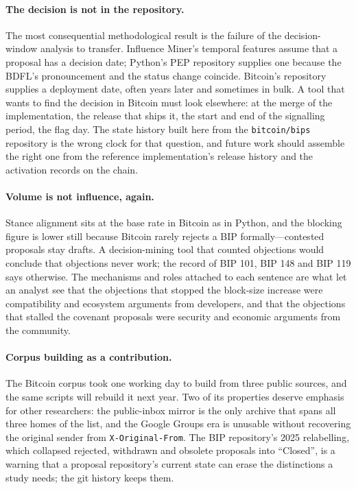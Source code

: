 \documentclass[sigconf,screen]{acmart}
\begin{document}
\paragraph{The decision is not in the repository.} The most consequential methodological result is the failure of the decision-window analysis to transfer. Influence Miner's temporal features assume that a proposal has a decision date; Python's PEP repository supplies one because the BDFL's pronouncement and the status change coincide. Bitcoin's repository supplies a deployment date, often years later and sometimes in bulk. A tool that wants to find the decision in Bitcoin must look elsewhere: at the merge of the implementation, the release that ships it, the start and end of the signalling period, the flag day. The state history built here from the \texttt{bitcoin/bips} repository is the wrong clock for that question, and future work should assemble the right one from the reference implementation's release history and the activation records on the chain.

\paragraph{Volume is not influence, again.} Stance alignment sits at the base rate in Bitcoin as in Python, and the blocking figure is lower still because Bitcoin rarely rejects a BIP formally---contested proposals stay drafts. A decision-mining tool that counted objections would conclude that objections never work; the record of BIP 101, BIP 148 and BIP 119 says otherwise. The mechanisms and roles attached to each sentence are what let an analyst see that the objections that stopped the block-size increase were compatibility and ecosystem arguments from developers, and that the objections that stalled the covenant proposals were security and economic arguments from the community.

\paragraph{Corpus building as a contribution.} The Bitcoin corpus took one working day to build from three public sources, and the same scripts will rebuild it next year. Two of its properties deserve emphasis for other researchers: the public-inbox mirror is the only archive that spans all three homes of the list, and the Google Groups era is unusable without recovering the original sender from \texttt{X-Original-From}. The BIP repository's 2025 relabelling, which collapsed rejected, withdrawn and obsolete proposals into ``Closed'', is a warning that a proposal repository's current state can erase the distinctions a study needs; the git history keeps them.
\end{document}
